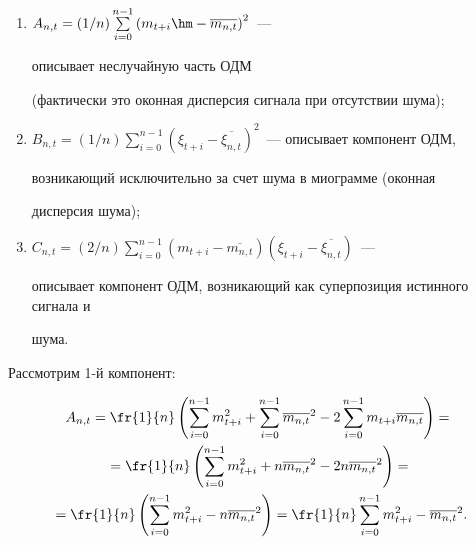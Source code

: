     \begin{enumerate}[(1)]


        \item $A_{n,t} = ({1}/{n})\sum\limits^{n-1}_{i=0}\left(m_{t+i}\hm -


        \overline{m_{n,t}}\right)^2$~---


        описывает неслучайную часть ОДМ


        (фактически это оконная дисперсия сигнала при отсутствии шума);


        \item $B_{n,t} = ({1}/{n})\sum\limits^{n-1}_{i=0}\left(\xi_{t+i}


        - \overline{\xi_{n,t}}\right)^2$~--- описывает компонент ОДМ,


        возника\-ющий исключительно за счет шума в миограмме (оконная


        дисперсия шума);


        \item $C_{n,t} = ({2}/{n})\sum\limits^{n-1}_{i=0}\left(m_{t+i} -


        \overline{m_{n,t}}\right)\left(\xi_{t+i} - \overline{\xi_{n,t}}\right)$~---


        описывает компонент ОДМ, возникающий как суперпозиция истинного сигнала и


        шума.


    \end{enumerate}





    Рассмотрим 1-й компонент:


    \begin{multline}


        \label{window_moment_2_v1_1st_component}


                A_{n,t} = \fr{1}{n}\left(\sum\limits^{n-1}_{i=0}m^2_{t+i} +


                \sum\limits^{n-1}_{i=0}\overline{m_{n,t}}^2 -


                2\sum\limits^{n-1}_{i=0}m_{t+i}\overline{m_{n,t}}\right) ={} \\


                {}= \fr{1}{n}\left(\sum\limits^{n-1}_{i=0}m^2_{t+i} +


                n\overline{m_{n,t}}^2 - 2n\overline{m_{n,t}}^2\right) = {}\\


                {}= \fr{1}{n}\left(\sum\limits^{n-1}_{i=0}m^2_{t+i} -


                n\overline{m_{n,t}}^2\right) = \fr{1}{n}\sum\limits^{n-1}_{i=0}m^2_{t+i} -


                \overline{m_{n,t}}^2.


    \end{multline}





